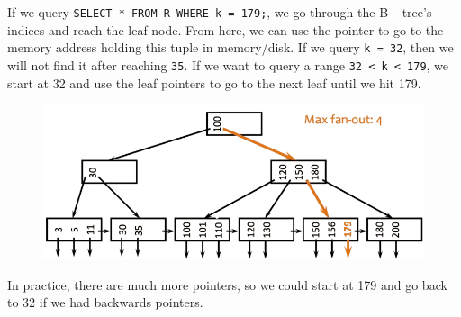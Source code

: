     \begin{algo}[Lookup]
      If we query \texttt{SELECT * FROM R WHERE k = 179;}, we go through the B+ tree's indices and reach the leaf node. From here, we can use the pointer to go to the memory address holding this tuple in memory/disk. If we query \texttt{k = 32}, then we will not find it after reaching \texttt{35}. If we want to query a range \texttt{32 < k < 179}, we start at 32 and use the leaf pointers to go to the next leaf until we hit 179.  

      \begin{figure}[H]
        \centering 
        \includegraphics[scale=0.4]{img/fanout_ex.png}
        \caption{} 
        \label{fig:fanout_ex}
      \end{figure}

      In practice, there are much more pointers, so we could start at 179 and go back to 32 if we had backwards pointers. 
    \end{algo}

